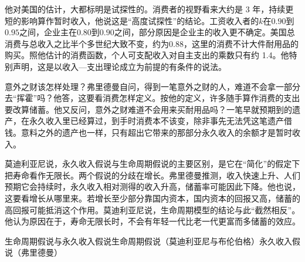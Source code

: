 他对美国的估计，大都标明是试探性的。消费者的视野看来大约是 3 年，持续更短的影响算作暂时收入，他说这是“高度试探性”的结论\cite{friedman1957}。工资收入者的$k$在$0.90$到$0.95$之间，企业主在$0.80$到$0.90$之间，部分原因是企业主的收入更不确定\cite{friedman1957}。美国总消费与总收入之比半个多世纪大致不变，约为$0.88$，这里的消费不计大件耐用品的购买\cite{friedman1957}。照他估计的消费函数，个人可支配收入对自主支出的乘数只有约 1.4\cite{friedman1957}。他特别声明，这是以收入—支出理论成立为前提的有条件的说法\cite{friedman1957}。

意外之财该怎样处理？弗里德曼自问，得到一笔意外之财的人，难道不会拿一部分去“挥霍”吗\cite{friedman1957}？他答，这要看消费怎样定义。按他的定义，许多随手算作消费的支出要改算储蓄\cite{friedman1957}。他又反问，意外之财难道不会用来买耐用品吗\cite{friedman1957}？一笔早就预期到的遗产，在永久收入里已经算过，到手时消费本不该变，除非事先无法凭这笔遗产借钱\cite{friedman1957}。意料之外的遗产也一样，只有超出它带来的那部分永久收入的余额才是暂时收入\cite{friedman1957}。

莫迪利亚尼说，永久收入假说与生命周期假说的主要区别，是它在“简化”的假定下把寿命看作无限长\cite{modigliani1985}。两个假说的分歧在增长。弗里德曼推测，收入快速上升、人们预期它会持续时，永久收入相对测得的收入升高，储蓄率可能因此下降\cite{friedman1957}。他也说，这要看增长从哪里来\cite{friedman1957}。若增长至少部分靠国内资本，国内资本的回报又高，储蓄的高回报可能抵消这个作用\cite{friedman1957}。莫迪利亚尼说，生命周期模型的结论与此“截然相反”\cite{modigliani1985}。他认为原因在于，寿命无限长时，不会有年轻一代比老一代更富而多储蓄的效应\cite{modigliani1985}。

\begin{compare}{生命周期假说与永久收入假说}{生命周期假说（莫迪利亚尼与布伦伯格）}{永久收入假说（弗里德曼）}
\end{compare}

